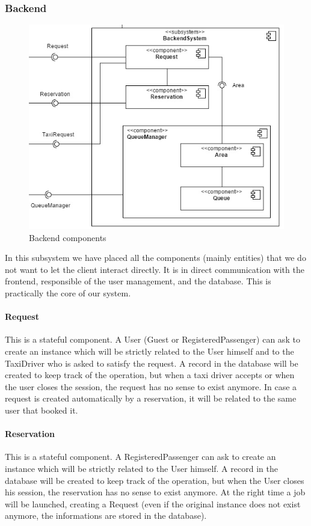	\subsubsection{Backend}
	\begin{figure}[h!]
		\begin{center}
			\includegraphics[width=1\linewidth]{../SE2_IMAGES/Backend}
			\caption{Backend components}
		\end{center}
	\end{figure}
	In this subsystem we have placed all the components (mainly entities) that we do not want to let the client
	interact directly. It is in direct communication with the frontend, responsible of the user
	management, and the database. This is practically the core of our system.
		\paragraph{Request}
		This is a stateful component. A User (Guest or RegisteredPassenger) can ask to create an instance
		which will be strictly related to the User himself and to the TaxiDriver who is asked to satisfy the
		request. A record in the database will be created to keep track of the operation, but when a taxi
		driver accepts or when the user closes the session, the request has no sense to exist anymore.
		In case a request is created automatically by a reservation, it will be related to the same user that booked it.
		\paragraph{Reservation}
		This is a stateful component. A RegisteredPassenger can ask to create an instance
		which will be strictly related to the User himself. A record in the database will be created to
		keep track of the operation, but when the User closes his session, the reservation has no sense to exist
		anymore. At the right time a job will be launched, creating a Request (even if the original instance
		does not exist anymore, the informations are stored in the database).
